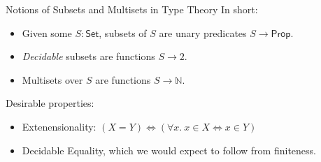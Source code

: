 \documentclass[aspectratio=169]{beamer}
\begin{document}


\begin{frame}{Notions of Subsets and Multisets in Type Theory}
In short:
\begin{itemize}
          \smallskip
  \item Given some $S : \mathsf{Set}$, subsets of $S$ are unary predicates $S \to \mathsf{Prop}$.
          \smallskip
  \item \emph{Decidable} subsets are functions $S \to 2$.
          \smallskip
  \item Multisets over $S$ are functions $S \to \mathbb{N}$.
          \smallskip
\end{itemize}
\bigskip

\pause{}

Desirable properties:
\begin{itemize}
          \smallskip
  \item Extenensionality: \pause $(X = Y) \iff (\forall x.~x \in X \iff x \in Y)$
        \pause
          \smallskip
  \item Decidable Equality\pause{}, which we would expect to follow from finiteness.
          \smallskip
\end{itemize}
\end{frame}
\end{document}
